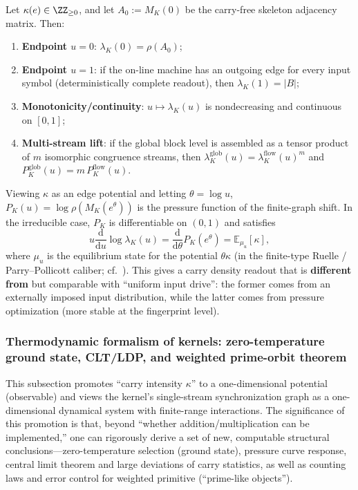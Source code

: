 \begin{proposition}\label{prop:kernel-pressure-endpoints}
Let $\kappa(e)\in\ZZ_{\ge 0}$, and let $A_0:=M_K(0)$ be the carry-free skeleton adjacency matrix.
Then:
\begin{enumerate}
  \item \textbf{Endpoint $u=0$}: $\lambda_K(0)=\rho(A_0)$;
  \item \textbf{Endpoint $u=1$}: if the on-line machine has an outgoing edge for every input symbol (deterministically complete readout), then $\lambda_K(1)=|B|$;
  \item \textbf{Monotonicity/continuity}: $u\mapsto \lambda_K(u)$ is nondecreasing and continuous on $[0,1]$;
  \item \textbf{Multi-stream lift}: if the global block level is assembled as a tensor product of $m$ isomorphic congruence streams, then
  \(
  \lambda^{\mathrm{glob}}_K(u)=\lambda^{\mathrm{flow}}_K(u)^m
  \)
  and
  \(
  P^{\mathrm{glob}}_K(u)=m\,P^{\mathrm{flow}}_K(u)
  \).
\end{enumerate}
\end{proposition}

\begin{remark}
Viewing $\kappa$ as an edge potential and letting $\theta=\log u$, $P_K(u)=\log\rho(M_K(e^\theta))$ is the pressure function of the finite-graph shift.
In the irreducible case, $P_K$ is differentiable on $(0,1)$ and satisfies
\[
u\frac{\mathrm{d}}{\mathrm{d}u}\log\lambda_K(u)
=\frac{\mathrm{d}}{\mathrm{d}\theta}P_K(e^\theta)
=\mathbb{E}_{\mu_u}[\kappa],
\]
where $\mu_u$ is the equilibrium state for the potential $\theta\kappa$ (in the finite-type Ruelle / Parry--Pollicott caliber; cf.\ \cite{Ruelle1978Thermodynamic,ParryPollicott1990Zeta}).
This gives a carry density readout that is \textbf{different from} but comparable with ``uniform input drive'': the former comes from an externally imposed input distribution, while the latter comes from pressure optimization (more stable at the fingerprint level).
\end{remark}

\subsubsection{Thermodynamic formalism of kernels: zero-temperature ground state, CLT/LDP, and weighted prime-orbit theorem}\label{subsec:kernel-thermo}
This subsection promotes ``carry intensity $\kappa$'' to a one-dimensional potential (observable) and views the kernel's single-stream synchronization graph as a one-dimensional dynamical system with finite-range interactions. The significance of this promotion is that, beyond ``whether addition/multiplication can be implemented,'' one can rigorously derive a set of new, computable structural conclusions---zero-temperature selection (ground state), pressure curve response, central limit theorem and large deviations of carry statistics, as well as counting laws and error control for weighted primitive (``prime-like objects'').

